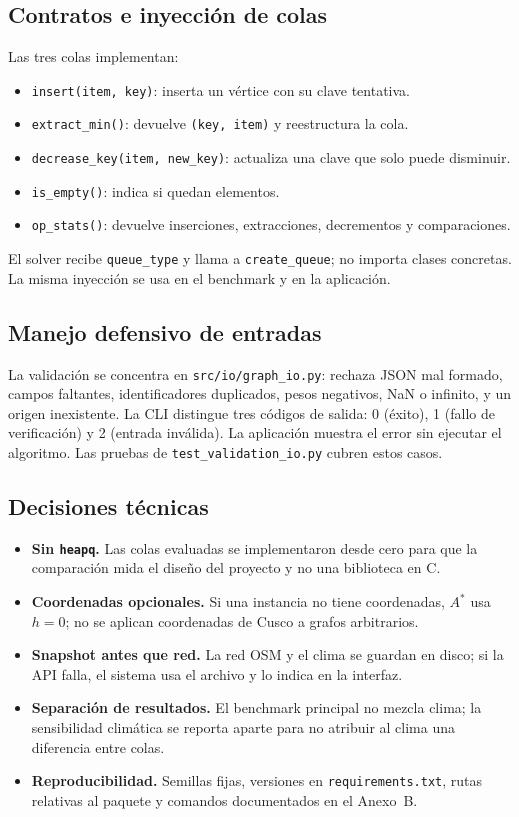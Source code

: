 \subsection{Contratos e inyección de colas}
Las tres colas implementan:
\begin{itemize}
    \item \texttt{insert(item, key)}: inserta un vértice con su clave tentativa.
    \item \texttt{extract\_min()}: devuelve \texttt{(key, item)} y reestructura la cola.
    \item \texttt{decrease\_key(item, new\_key)}: actualiza una clave que solo puede disminuir.
    \item \texttt{is\_empty()}: indica si quedan elementos.
    \item \texttt{op\_stats()}: devuelve inserciones, extracciones, decrementos y comparaciones.
\end{itemize}
El solver recibe \texttt{queue\_type} y llama a \texttt{create\_queue}; no importa clases concretas. La misma inyección se usa en el benchmark y en la aplicación.

\subsection{Manejo defensivo de entradas}
La validación se concentra en \texttt{src/io/graph\_io.py}: rechaza JSON mal formado, campos faltantes, identificadores duplicados, pesos negativos, NaN o infinito, y un origen inexistente. La CLI distingue tres códigos de salida: 0 (éxito), 1 (fallo de verificación) y 2 (entrada inválida). La aplicación muestra el error sin ejecutar el algoritmo. Las pruebas de \texttt{test\_validation\_io.py} cubren estos casos.

\subsection{Decisiones técnicas}
\begin{itemize}
    \item \textbf{Sin \texttt{heapq}.} Las colas evaluadas se implementaron desde cero para que la comparación mida el diseño del proyecto y no una biblioteca en C.
    \item \textbf{Coordenadas opcionales.} Si una instancia no tiene coordenadas, $A^*$ usa $h=0$; no se aplican coordenadas de Cusco a grafos arbitrarios.
    \item \textbf{Snapshot antes que red.} La red OSM y el clima se guardan en disco; si la API falla, el sistema usa el archivo y lo indica en la interfaz.
    \item \textbf{Separación de resultados.} El benchmark principal no mezcla clima; la sensibilidad climática se reporta aparte para no atribuir al clima una diferencia entre colas.
    \item \textbf{Reproducibilidad.} Semillas fijas, versiones en \texttt{requirements.txt}, rutas relativas al paquete y comandos documentados en el Anexo~B.
\end{itemize}

